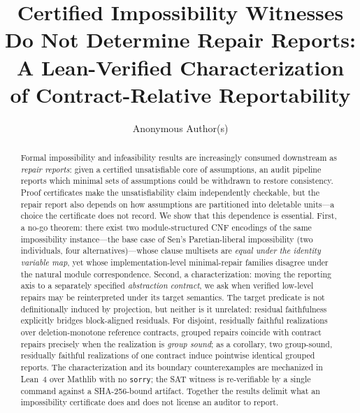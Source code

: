 \documentclass[sigplan,10pt,review,anonymous]{acmart}
\theoremstyle{acmdefinition}
\newcommand{\code}[1]{\texttt{#1}}
\begin{document}
\title{Certified Impossibility Witnesses Do Not Determine Repair Reports:
A Lean-Verified Characterization of Contract-Relative Reportability}

\author{Anonymous Author(s)}

\begin{abstract}
Formal impossibility and infeasibility results are increasingly consumed
downstream as \emph{repair reports}: given a certified unsatisfiable core of
assumptions, an audit pipeline reports which minimal sets of assumptions could
be withdrawn to restore consistency. Proof certificates make the
unsatisfiability claim independently checkable, but the repair report also
depends on how assumptions are partitioned into deletable units---a choice the
certificate does not record. We show that this dependence is essential. First,
a no-go theorem: there exist two module-structured CNF encodings of the same
impossibility instance---the base case of Sen's Paretian-liberal impossibility
(two individuals, four alternatives)---whose
clause multisets are \emph{equal under the identity variable map}, yet whose
implementation-level minimal-repair families disagree under the natural module
correspondence. Second, a characterization: moving the reporting axis to a
separately specified \emph{abstraction contract}, we ask when verified
low-level repairs may be reinterpreted under its target semantics. The target
predicate is not definitionally induced by projection, but neither is it
unrelated: residual faithfulness explicitly bridges block-aligned residuals.
For disjoint, residually faithful realizations over deletion-monotone reference
contracts, grouped repairs coincide with contract repairs precisely when the
realization is \emph{group sound}; as a corollary, two group-sound, residually
faithful realizations of one contract induce pointwise identical grouped
reports. The characterization and its boundary
counterexamples are mechanized in Lean~4 over Mathlib with no \code{sorry};
the SAT witness is re-verifiable by a single command against a SHA-256-bound
artifact. Together the results delimit what an impossibility certificate does
and does not license an auditor to report.
\end{abstract}


\maketitle
\end{document}
